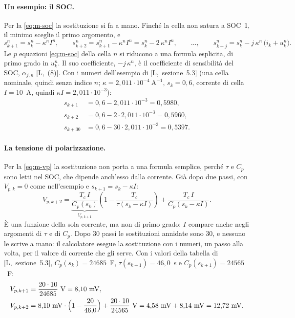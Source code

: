 \documentclass[11pt,a4paper]{article}
\begin{document}
\paragraph{Un esempio: il SOC.} Per la \eqref{eq:m-soc} la sostituzione si fa
a mano. Finché la cella non satura a SOC~1, il minimo sceglie il primo
argomento, e
\[
  s^n_{k+1} = s^n_k - \kappa^n I^n , \qquad
  s^n_{k+2} = s^n_{k+1} - \kappa^n I^n = s^n_k - 2\,\kappa^n I^n , \qquad
  \dots , \qquad
  s^n_{k+j} = s^n_k - j\,\kappa^n\,\bigl(i_k + u^n_k\bigr) .
\]
Le $p$ equazioni \eqref{eq:m-soc} della cella $n$ si riducono a una formula
esplicita, di primo grado in $u^n_k$. Il suo coefficiente, $-j\,\kappa^n$, è il
coefficiente di sensibilità del SOC, $\alpha_{j,n}$ [L,~(8)]. Con i numeri
dell'esempio di [L,~sezione~5.3] (una cella nominale, quindi senza indice $n$;
$\kappa = 2{,}011 \cdot 10^{-4}~\mathrm{A}^{-1}$, $s_k = 0{,}6$, corrente di
cella $I = 10$~A, quindi $\kappa I = 2{,}011 \cdot 10^{-3}$):
\begin{align*}
  s_{k+1}  &= 0{,}6 - 2{,}011 \cdot 10^{-3} = 0{,}5980 , \\
  s_{k+2}  &= 0{,}6 - 2 \cdot 2{,}011 \cdot 10^{-3} = 0{,}5960 , \\
  s_{k+30} &= 0{,}6 - 30 \cdot 2{,}011 \cdot 10^{-3} = 0{,}5397 .
\end{align*}

\paragraph{La tensione di polarizzazione.} Per la \eqref{eq:m-vp} la
sostituzione non porta a una formula semplice, perché $\tau$ e $C_p$ sono
letti nel SOC, che dipende anch'esso dalla corrente. Già dopo due passi, con
$V_{p,k} = 0$ come nell'esempio e $s_{k+1} = s_k - \kappa I$:
\[
  V_{p,k+2}
  = \underbrace{\frac{T_c\, I}{C_p(s_k)}}_{V_{p,k+1}}
    \left( 1 - \frac{T_c}{\tau(s_k - \kappa I)} \right)
    + \frac{T_c\, I}{C_p(s_k - \kappa I)} .
\]
È una funzione della sola corrente, ma non di primo grado: $I$ compare anche
negli argomenti di $\tau$ e di $C_p$. Dopo 30 passi le sostituzioni annidate
sono 30, e nessuno le scrive a mano: il calcolatore esegue la sostituzione con
i numeri, un passo alla volta, per il valore di corrente che gli serve. Con i
valori della tabella di [L,~sezione~5.3], $C_p(s_k) = 24685$~F,
$\tau(s_{k+1}) = 46{,}0$~s e $C_p(s_{k+1}) = 24565$~F:
\begin{align*}
  V_{p,k+1} &= \frac{20 \cdot 10}{24685}~\mathrm{V} = 8{,}10~\mathrm{mV} , \\
  V_{p,k+2} &= 8{,}10~\mathrm{mV} \cdot \Bigl(1 - \frac{20}{46{,}0}\Bigr)
              + \frac{20 \cdot 10}{24565}~\mathrm{V}
             = 4{,}58~\mathrm{mV} + 8{,}14~\mathrm{mV} = 12{,}72~\mathrm{mV} .
\end{align*}
\end{document}
